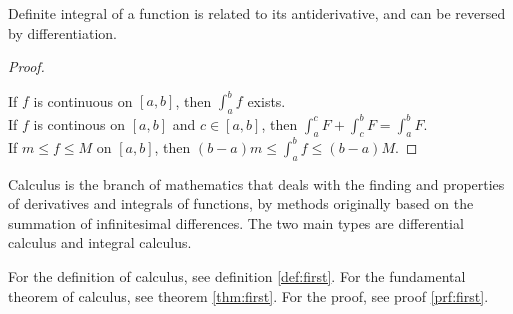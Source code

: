         \begin{sample}
    \begin{theorem}
        \label{thm:first}
        Definite integral of a function is related to its antiderivative, and can be reversed by differentiation.
    \end{theorem}
    \begin{proof}
        \label{prf:first}
        If $f$ is continuous on $[a, b]$, 
            then $\int_a^b f$ exists. \\
        If $f$ is continous on $[a, b]$ and $c \in [a, b]$, 
            then $\int_a^c F + \int_c^b F = \int_a^b F$. \\
        If $m \leq f \leq M$ on $[a, b]$, 
            then $(b - a)m \leq \int_a^b f \leq (b - a)M$.
    \end{proof}
    \begin{definition}
        \label{def:first}
        Calculus is the branch of mathematics that deals with the finding and properties of derivatives and integrals of functions, by methods originally based on the summation of infinitesimal differences. The two main types are differential calculus and integral calculus.
    \end{definition}
    For the definition of calculus, see definition \ref{def:first}. For the fundamental theorem of calculus, see theorem \ref{thm:first}. For the proof, see proof \ref{prf:first}.
        \end{sample}
		

